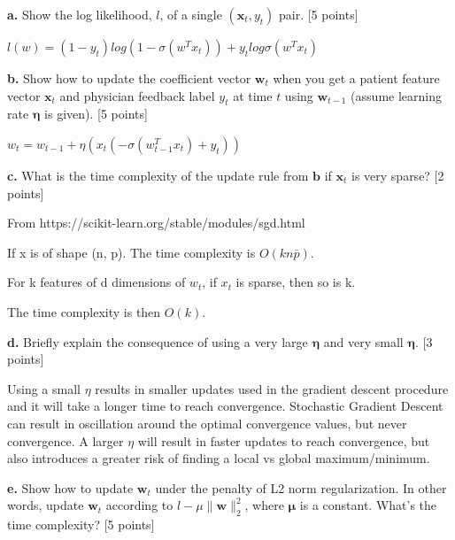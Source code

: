 \documentclass[12pt]{article}
\begin{document}
\textbf{a.} Show the log likelihood, $l$, of a single $(\mathbf{x}_t, y_t)$ pair. [5 points]

\vspace{5mm}

$ l(w) = (1-y_{t})log(1-\sigma(w^Tx_{t})) + y_ {t} log \sigma(w^Tx_{t}) $

\vspace{5mm}

\textbf{b.} Show how to update the coefficient vector $\mathbf{w}_t$ when you get a patient feature vector $\mathbf{x}_t$ and physician feedback label $y_t$ at time $t$ using $\mathbf{w}_{t-1}$ (assume learning rate $\mathbf{\eta}$ is given). [5 points]


\vspace{5mm}

$ w_{t} = w_{t-1} + \eta(x_{t}(-\sigma(w_{t-1}^{T}x_{t}) + y_{t}))$

\vspace{5mm}

\textbf{c.} What is the time complexity of the update rule from $\mathbf{b}$ if $\mathbf{x}_t$ is very sparse? [2 points]

\vspace{5mm}

From https://scikit-learn.org/stable/modules/sgd.html

If x is of shape (n, p).  The time complexity is $O(kn \bar{p})$.

For k features of d dimensions of $w_{t}$, if $x_{t}$ is sparse, then so is k. 

The time complexity is then $O(k)$.

\vspace{5mm}

\textbf{d.} Briefly explain the consequence of using a very large $\mathbf{\eta}$ and very small $\mathbf{\eta}$. [3 points]

\vspace{5mm}

Using a small $\eta$ results in smaller updates used in the gradient descent procedure and it will take a longer time to reach convergence.  Stochastic Gradient Descent can result in oscillation around the optimal convergence values, but never convergence.  A larger $\eta$ will result in faster updates to reach convergence, but also introduces a greater risk of finding a local vs global maximum/minimum.

\vspace{5mm}

\textbf{e.} Show how to update $\mathbf{w}_t$ under the penalty of L2 norm regularization. In other words, update $\mathbf{w}_t$ according to $l - \mu \|\mathbf{w}\|_2^2 $, where $\mathbf{\mu}$ is a constant. What's the time complexity? [5 points]
\end{document}
